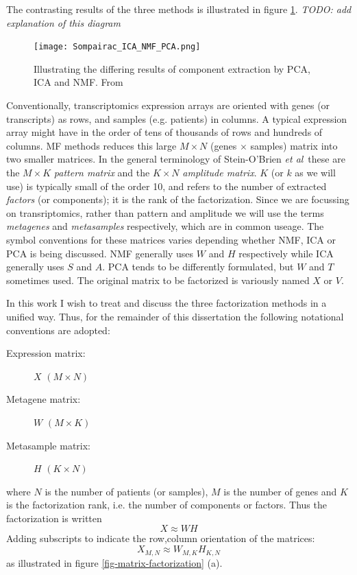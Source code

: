 \documentclass[draft,tikz, 12pt,a4paper,oneside,fleqn]{article}
\newcommand{\etal}{{\em et al\/}}
\begin{document}
The contrasting results of the three methods is illustrated in figure \ref{fig-pca-ica-nmp-explanation}. \emph{TODO: add explanation of this diagram}

\begin{figure}[htb!]
\begin{center}
\texttt{[image: Sompairac\_ICA\_NMF\_PCA.png]}
\end{center}
\caption{Illustrating the differing results of component extraction by PCA, ICA and NMF.  From \cite{Sompairac2019}}
\label{fig-pca-ica-nmp-explanation}
\end{figure}


Conventionally, transcriptomics expression arrays are oriented with genes (or transcripts) as rows, and samples (e.g. patients) in columns.   
A typical expression array might have in the order of tens of thousands of rows and hundreds of columns.  
MF methods reduces this large $M \times N$ (genes $\times$ samples) matrix into two smaller matrices.
In the general terminology of Stein-O'Brien \etal\ these are the $M \times K$ \emph{pattern matrix} and the $K \times N$ \emph{amplitude matrix}.  $K$ (or $k$ as we will use) is typically small of the order 10, and refers to the number of extracted \emph{factors} (or components); it is the rank of the factorization.
Since we are focussing on transriptomics, rather than pattern and amplitude we will use the terms \emph{metagenes} and \emph{metasamples} respectively, which are in common useage.  The symbol conventions for these matrices varies depending whether NMF, ICA or PCA is being discussed.   NMF generally uses $W$ and $H$ respectively while ICA generally uses $S$ and $A$.  PCA tends to be differently formulated, but $W$ and $T$ sometimes used.   The original matrix to be factorized is variously named $X$ or $V$.

In this work I wish to treat and discuss the three factorization methods in a unified way.  Thus, for the remainder of this dissertation the following notational conventions are adopted:
\begin{description}
\item[Expression matrix:] $X$ $(M \times N)$
\item[Metagene matrix:] $W$ $(M \times K)$
\item[Metasample matrix:] $H$ $(K \times N)$
\end{description}
where $N$ is the number of patients (or samples), $M$ is the number of genes and $K$ is the factorization rank, i.e. the number of components or factors.  Thus the factorization is written
\begin{equation}
X \approx W H
\end{equation}
Adding subscripts to indicate the row,column orientation of the matrices:
\begin{equation}
X_{M,N} \approx W_{M,K} H_{K,N}
\end{equation}
as illustrated in figure \ref{fig-matrix-factorization} (a).
\end{document}
